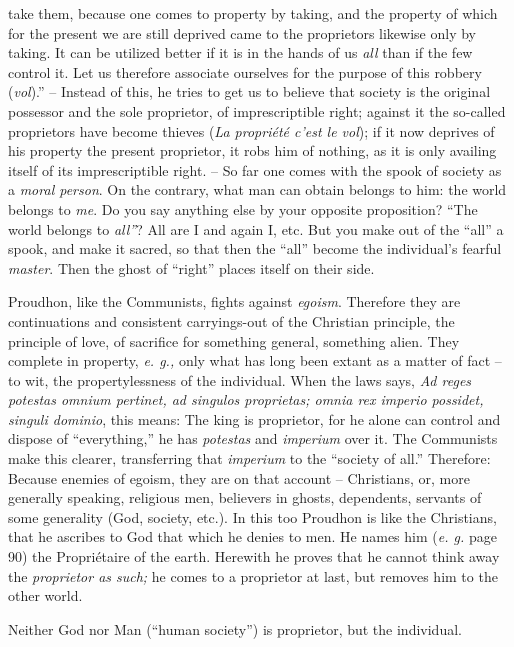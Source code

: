 \documentclass[12pt,a4paper]{book}
\begin{document}
take them, because one comes to property by taking, and the property of which 
for the present we are still deprived came to the proprietors likewise only by 
taking. It can be utilized better if it is in the hands of us \textit{all} 
than if the few control it. Let us therefore associate ourselves for the 
purpose of this robbery (\textit{vol}).'' -- Instead of this, he tries to get 
us to believe that society is the original possessor and the sole proprietor, 
of imprescriptible right; against it the so-called proprietors have become 
thieves (\textit{La propri\'et\'e c'est le vol}); if it now deprives of his 
property the present proprietor, it robs him of nothing, as it is only 
availing itself of its imprescriptible right. -- So far one comes with the 
spook of society as a \textit{moral person}. On the contrary, what man can 
obtain belongs to him: the world belongs to \textit{me}. Do you say anything 
else by your opposite proposition? ``The world belongs to \textit{all''}? 
All are I and again I, etc. But you make out of the ``all'' a spook, and 
make it sacred, so that then the ``all'' become the individual's fearful 
\textit{master}. Then the ghost of ``right'' places itself on their side.

Proudhon, like the Communists, fights against \textit{egoism}. Therefore they 
are continuations and consistent carryings-out of the Christian principle, the 
principle of love, of sacrifice for something general, something alien. They 
complete in property, \textit{e. g.,} only what has long been extant as a 
matter of fact -- to wit, the propertylessness of the individual. When the 
laws says, \textit{Ad reges potestas omnium pertinet, ad singulos proprietas; 
omnia rex imperio possidet, singuli dominio}, this means: The king is 
proprietor, for he alone can control and dispose of ``everything,'' he has 
\textit{potestas} and \textit{imperium} over it. The Communists make this 
clearer, transferring that \textit{imperium} to the ``society of all.'' 
Therefore: Because enemies of egoism, they are on that account -- Christians, 
or, more generally speaking, religious men, believers in ghosts, dependents, 
servants of some generality (God, society, etc.). In this too Proudhon is like 
the Christians, that he ascribes to God that which he denies to men. He names 
him (\textit{e. g.} page 90) the Propri\'etaire of the earth. Herewith he 
proves that he cannot think away the \textit{proprietor as such;} he comes to 
a proprietor at last, but removes him to the other world.

Neither God nor Man (``human society'') is proprietor, but the individual.
\end{document}
